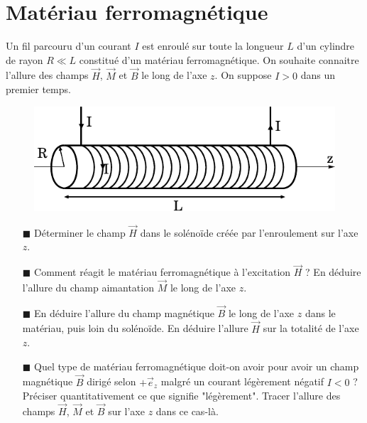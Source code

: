 \documentclass{report}
\begin{document}
\newpage

\section*{Matériau ferromagnétique}

Un fil parcouru d'un courant $I$ est enroulé sur toute la longueur $L$ d'un cylindre de rayon $R\ll L$ constitué d'un matériau ferromagnétique. On souhaite connaitre l'allure des champs $\vec{H}$, $\vec{M}$ et $\vec{B}$ le long de l'axe $z$. On suppose $I>0$ dans un premier temps.
	
		\begin{figure}[h!]
	\centering
		\includegraphics[scale=0.9]{ferro.pdf}
	\end{figure}	
	
\begin{itemize}

	\item[$\blacksquare$] Déterminer le champ $\vec{H}$ dans le solénoïde créée par l'enroulement sur l'axe $z$. 
	
	\item[$\blacksquare$] Comment réagit le matériau ferromagnétique à l'excitation $\vec{H}$ ? En déduire l'allure du champ aimantation $\vec{M}$ le long de l'axe $z$. 
	
	\item[$\blacksquare$] En déduire l'allure du champ magnétique $\vec{B}$ le long de l'axe $z$ dans le matériau, puis loin du solénoïde. En déduire l'allure $\vec{H}$ sur la totalité de l'axe $z$.
	
	\item[$\blacksquare$] Quel type de matériau ferromagnétique doit-on avoir pour avoir un champ magnétique $\vec{B}$ dirigé selon $+\vec{e}_z$ malgré un courant légèrement négatif $I<0$ ? Préciser quantitativement ce que signifie "légèrement". Tracer l'allure des champs $\vec{H}$, $\vec{M}$ et $\vec{B}$ sur l'axe $z$ dans ce cas-là.

\end{itemize}
\end{document}
